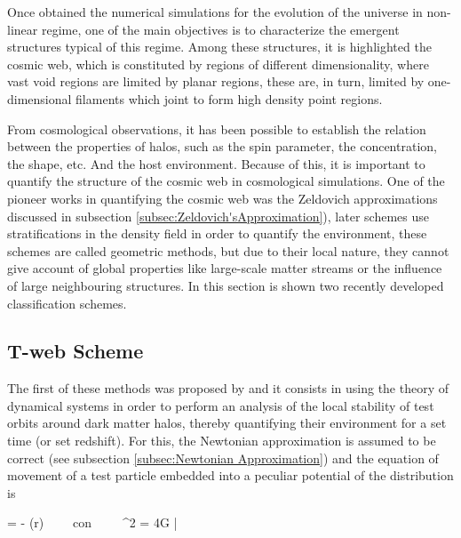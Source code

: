 Once obtained the numerical simulations for the evolution of the universe 
in non-linear regime, one of the main objectives is to characterize the 
emergent structures typical of this regime. Among these structures, it is
highlighted the cosmic web, which is constituted by regions of different 
dimensionality, where vast void regions are limited by planar regions, 
these are, in turn, limited by one-dimensional filaments which joint to 
form high density point regions.


From cosmological observations, it has been possible to establish the 
relation between the properties of halos, such as the spin parameter, the
concentration, the shape, etc. And the host environment. Because of this,
it is important to quantify the structure of the cosmic web in cosmological
simulations. One of the pioneer works in quantifying the cosmic web was 
the Zeldovich approximations discussed in subsection 
\ref{subsec:Zeldovich'sApproximation}), later schemes use stratifications
in the density field in order to quantify the environment, these schemes
are called geometric methods, but due to their local nature, they cannot
give account of global properties like large-scale matter streams or the
influence of large neighbouring structures. In this section is shown two
recently developed classification schemes.



	\subsection{T-web Scheme}
	\label{subsec:TheT-webMethod}


The first of these methods was proposed by \cite{Hahn2007} and it consists
in using the theory of dynamical systems in order to perform an analysis
of the local stability of test orbits around dark matter halos, thereby
quantifying their environment for a set time (or set redshift). For this,
the Newtonian approximation is assumed to be correct (see subsection 
\ref{subsec:Newtonian Approximation}) and the equation of movement of a 
test particle embedded into a peculiar potential of the distribution is



{  = - \nabla \phi(\bds r) \ \ \ \ 
\mbox{con}\ \ \ \ \ \nabla^2 \phi = 4\pi G \bar \rho \delta}


